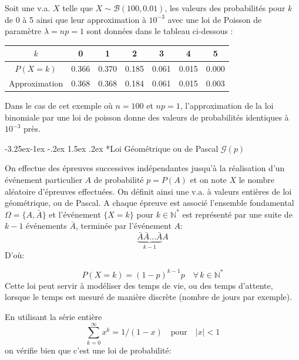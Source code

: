 \documentclass[]{book}
\makeatletter
\renewcommand\subsection{\@startsection{subsection}{2}{\z@}%
                                     {-3.25ex\@plus -1ex \@minus -.2ex}%
                                     {1.5ex \@plus .2ex}%
                                     {\normalfont\large\bfseries\color{Violet}}}
\theoremstyle{magentacolor}
\theoremstyle{proprie}
\theoremstyle{exstyle}
\theoremstyle{exostyle}
\theoremstyle{definition}
\theoremstyle{definition}
\theoremstyle{definition}
\theoremstyle{remark}
\makeatother
\begin{document}
Soit une v.a. \(X\) telle que \(X \sim \mathcal{B}(100, 0.01)\), les valeurs
des probabilités pour \(k\) de 0 à 5 ainsi que leur approximation à
\(10^{-3}\) avec une loi de Poisson de paramètre \(\lambda= np =1\) sont
données dans le tableau ci-dessous :

\begin{longtable}[]{@{}ccccccc@{}}
\toprule
\(k\) & 0 & 1 & 2 & 3 & 4 & 5\tabularnewline
\midrule
\endhead
\(P(X = k)\) & 0.366 & 0.370 & 0.185 & 0.061 & 0.015 & 0.000\tabularnewline
Approximation & 0.368 & 0.368 & 0.184 & 0.061 & 0.015 & 0.003\tabularnewline
\bottomrule
\end{longtable}

Dans le cas de cet exemple où \(n =100\) et \(np =1\), l'approximation de la
loi binomiale par une loi de poisson donne des valeurs de probabilités
identiques à \(10^{-3}\) près.

\hypertarget{loi-geometrique-ou-de-pascal-mathcalgp}{%
\subsection*{\texorpdfstring{Loi Géométrique ou de Pascal \(\mathcal{G}(p)\)}{Loi Géométrique ou de Pascal \textbackslash mathcal\{G\}(p)}}\label{loi-geometrique-ou-de-pascal-mathcalgp}}

On effectue des épreuves successives indépendantes jusqu'à la
réalisation d'un événement particulier \(A\) de probabilité \(p=P(A)\) et on
note \(X\) le nombre aléatoire d'épreuves effectuées. On définit ainsi une
v.a. à valeurs entières de loi géométrique, ou de Pascal. A chaque
épreuve est associé l'ensemble fondamental \(\Omega=\{A, \bar{A}\}\) et
l'événement \(\{X=k\}\) pour \(k\in \mathbb{N^*}\) est représenté par une
suite de \(k-1\) événements \(\bar{A}\), terminée par l'événement \(A\):
\[\underbrace{\bar{A}\bar{A}\ldots \bar{A}}_{k-1}A\] D'où:

\begin{equation}
    P(X=k)=(1-p)^{k-1}p \quad \forall \, k \in \mathbb{N^*}
    \label{eq:geom}
\end{equation}
Cette loi peut servir à modéliser des temps de vie, ou des temps
d'attente, lorsque le temps est mesuré de manière discrète (nombre de
jours par exemple).

En utilisant la série entière \[\label{eq:serie_entiere}
        \sum_{k=0}^\infty x^k = 1/(1-x) \quad \text{pour} \quad |x|<1\]
on vérifie bien que c'est une loi de probabilité:
\end{document}
